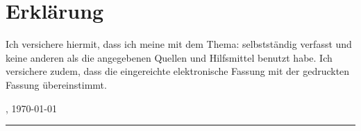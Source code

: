 
\thispagestyle{empty}

\section*{Erklärung}
\vspace*{2em}

Ich versichere hiermit, dass ich meine {\arbeit}
mit dem Thema: {\itshape \titel } selbstständig
verfasst und keine anderen als die angegebenen Quellen
und Hilfsmittel benutzt habe. Ich versichere zudem, dass
die eingereichte elektronische Fassung mit der gedruckten Fassung übereinstimmt.



% 





\vspace{3em}

\abgabeort, \today
\vspace{4em}

\rule{6cm}{0.4pt}\\
\Author
